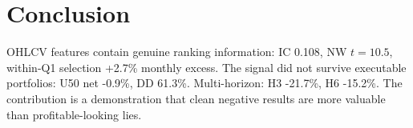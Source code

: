\section{Conclusion}
OHLCV features contain genuine ranking information: IC 0.108, NW $t = 10.5$, within-Q1 selection +2.7\% monthly excess.
The signal did not survive executable portfolios: U50 net -0.9\%, DD 61.3\%. Multi-horizon: H3 -21.7\%, H6 -15.2\%.
The contribution is a demonstration that clean negative results are more valuable than profitable-looking lies.
